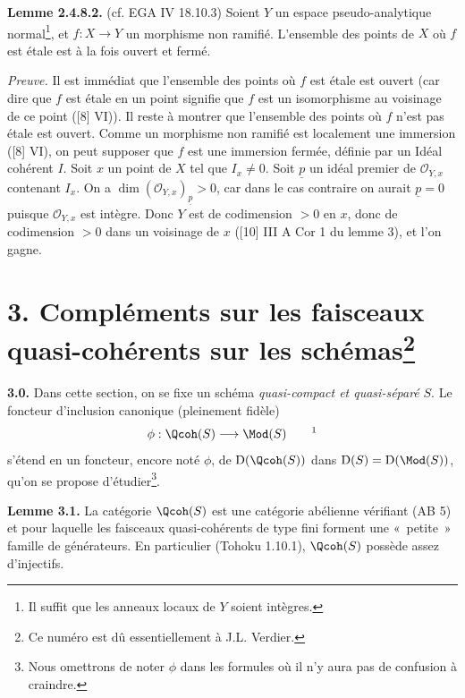 \textbf{Lemme 2.4.8.2.} (cf. EGA IV 18.10.3) Soient $Y$ un espace pseudo-analytique normal\footnote{Il suffit que les anneaux locaux de $Y$ soient intègres.}, et $f:X\longrightarrow Y$ un morphisme non ramifié. L'ensemble des points de $X$ où $f$ est étale est à la fois ouvert et fermé.

\emph{Preuve.} Il est immédiat que l'ensemble des points où $f$ est étale est ouvert (car dire que $f$ est étale en un point signifie que $f$ est un isomorphisme au voisinage de ce point ([8] VI)). Il reste à montrer que l'ensemble des points où $f$ n'est pas étale est ouvert. Comme un morphisme non ramifié est localement une immersion ([8] VI), on peut supposer que $f$ est une immersion fermée, définie par un Idéal cohérent $I$. Soit $x$ un point de $X$ tel que $I_x\ne0$. Soit $\underline{p}$ un idéal premier de $\mathcal O_{Y,x}$ contenant $I_x$. On a $\dim(\mathcal O_{Y,x})_{\underline{p}}>0$, car dans le cas contraire on aurait $\underline{p}=0$ puisque $\mathcal O_{Y,x}$ est intègre. Donc $Y$ est de codimension $>0$ en $x$, donc de codimension $>0$ dans un voisinage de $x$ ([10] III A Cor 1 du lemme 3), et l'on gagne.

\section*{3. Compléments sur les faisceaux quasi-cohérents sur les schémas\protect\footnote{Ce numéro est dû essentiellement à J.L. Verdier.}}

\textbf{3.0.} Dans cette section, on se fixe un schéma \emph{quasi-compact et quasi-séparé} $S$. Le foncteur d'inclusion canonique (pleinement fidèle)
\[
 \phi:\Qcoh(S)\longrightarrow\Mod(S)\qquad\text{\footnotemark}
\]
s'étend en un foncteur, encore noté $\phi$, de $\mathrm D(\Qcoh(S))$ dans $\mathrm D(S)=\mathrm D(\Mod(S))$, qu'on se propose d'étudier\footnote{Nous omettrons de noter $\phi$ dans les formules où il n'y aura pas de confusion à craindre.}.

\textbf{Lemme 3.1.} La catégorie $\Qcoh(S)$ est une catégorie abélienne vérifiant (AB 5) et pour laquelle les faisceaux quasi-cohérents de type fini forment une «~petite~» famille de générateurs. En particulier (Tohoku 1.10.1), $\Qcoh(S)$ possède assez d'injectifs.

